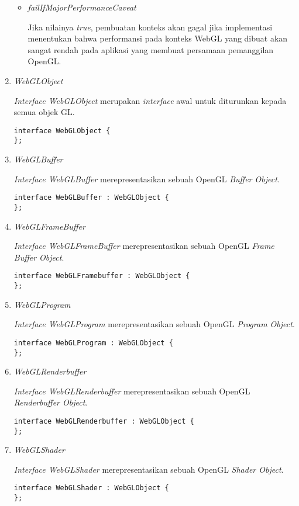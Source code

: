 \begin{enumerate}
\begin{itemize}
	\item {\it failIfMajorPerformanceCaveat}
	
	Jika nilainya {\it true}, pembuatan konteks akan gagal jika implementasi menentukan bahwa performansi pada konteks WebGL yang dibuat akan sangat rendah pada aplikasi yang membuat persamaan pemanggilan OpenGL.
	
	\end{itemize}
	
\item {\it WebGLObject}

	{\it Interface WebGLObject} merupakan {\it interface} awal untuk diturunkan kepada semua objek GL.
	\begin{lstlisting}
interface WebGLObject {
};
	\end{lstlisting}
	
\item {\it WebGLBuffer} 
	
	{\it Interface WebGLBuffer} merepresentasikan sebuah OpenGL {\it Buffer Object}.
	\begin{lstlisting}
interface WebGLBuffer : WebGLObject {
};
	\end{lstlisting}
	
\item {\it WebGLFrameBuffer}

	{\it Interface WebGLFrameBuffer} merepresentasikan sebuah OpenGL {\it Frame Buffer Object}.
	\begin{lstlisting}
interface WebGLFramebuffer : WebGLObject {
};
	\end{lstlisting}

\item {\it WebGLProgram}

	{\it Interface WebGLProgram} merepresentasikan sebuah OpenGL {\it Program Object}.
	\begin{lstlisting}
interface WebGLProgram : WebGLObject {
};
	\end{lstlisting}

\item {\it WebGLRenderbuffer}

	{\it Interface WebGLRenderbuffer} merepresentasikan sebuah OpenGL {\it Renderbuffer Object}.
	\begin{lstlisting}
interface WebGLRenderbuffer : WebGLObject {
};
	\end{lstlisting}

\item {\it WebGLShader}

	{\it Interface WebGLShader} merepresentasikan sebuah OpenGL {\it Shader Object}.
	\begin{lstlisting}
interface WebGLShader : WebGLObject {
};
	\end{lstlisting}


\end{enumerate}
